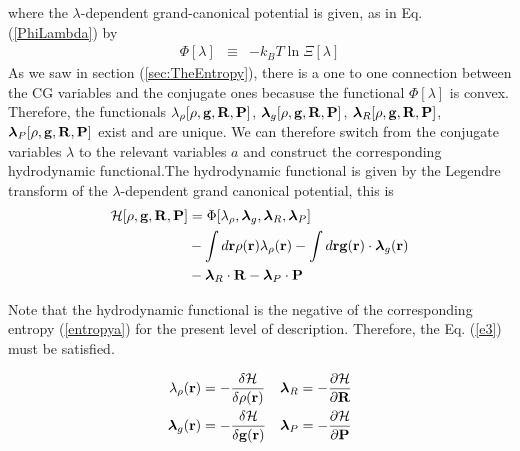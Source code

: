 \documentclass[a4paper,openright,12pt]{book}
\begin{document}
where the $\lambda$-dependent grand-canonical potential is given, as in Eq. (\ref{PhiLambda}) by
\begin{eqnarray}
  \Phi [\lambda]&\equiv&-k_BT \ln\Xi [\lambda]
\label{oh}
\end{eqnarray}
As we saw in section (\ref{sec:TheEntropy}), there is a one to one connection between the CG variables and the conjugate ones becasuse the functional $\Phi[\lambda]$ is convex.  
Therefore, the  functionals $\lambda_{\rho}[\rho,{\bf  g},{\bf R},{\bf
  P}]$,   $\boldsymbol{\lambda}_g[\rho,{\bf   g},{\bf  R},{\bf   P}]$,
$\boldsymbol{\lambda}_R[\rho,{\bf      g},{\bf      R},{\bf      P}]$,
$\boldsymbol{\lambda}_P[\rho,{\bf g},{\bf  R},{\bf P}]$ exist  and are
unique.   We  can  therefore   switch  from  the  conjugate  variables
$\lambda$   to  the   relevant   variables  $a$   and  construct   the
corresponding hydrodynamic functional.The   hydrodynamic functional   is    given   by   the   Legendre    transform   of   the $\lambda$-dependent grand canonical potential, this is
\begin{align}
{\cal H}[\rho,{\bf g},{\bf R},{\bf P}] &=
\Phi [\lambda_\rho,\boldsymbol{\lambda}_g,\boldsymbol{\lambda}_R,\boldsymbol{\lambda}_P]
\nonumber\\
& -
\int d{\bf r}\rho({\bf r})\lambda_\rho({\bf r})
-
\int d{\bf r}{\bf g}({\bf r})\cdot\boldsymbol{\lambda}_g({\bf r})
\nonumber\\
&
-\boldsymbol{\lambda}_R\cdot{\bf R}-\boldsymbol{\lambda}_P\cdot{\bf P}
\label{oleg}
\end{align}

Note that the hydrodynamic functional  is the negative of the corresponding entropy (\ref{entropya}) for the present level of description. Therefore, the Eq. (\ref{e3}) must be satisfied.

\begin{align}
  \lambda_\rho({\bf r}) &=-\frac{\delta {\cal H}}{\delta \rho({\bf r}) }
&&  \boldsymbol{\lambda}_R =-\frac{\partial {\cal H}}{\partial {\bf R} }
\nonumber\\
  \boldsymbol{\lambda}_g({\bf r}) &=-\frac{\delta {\cal H}}{\delta {\bf g}({\bf r}) }
&&  \boldsymbol{\lambda}_P =-\frac{\partial {\cal H}}{\partial{\bf P} }
\label{lno}
\end{align}
\end{document}
